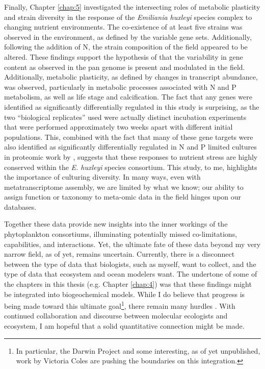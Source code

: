 Finally, Chapter \ref{chap:5} investigated the intersecting roles of metabolic plasticity and strain diversity in the response of the \textit{Emiliania huxleyi} species complex to changing nutrient environments. The co-existence of at least five strains was observed in the environment, as defined by the variable gene sets. Additionally, following the addition of N, the strain composition of the field appeared to be altered. These findings support the hypothesis of \citet{Read2013} that the variability in gene content as observed in the pan genome is present and modulated in the field. Additionally, metabolic plasticity, as defined by changes in transcript abundance, was observed, particularly in metabolic processes associated with N and P metabolism, as well as life stage and calcification. The fact that any genes were identified as significantly differentially regulated in this study is surprising, as the two ``biological replicates'' used were actually distinct incubation experiments that were performed approximately two weeks apart with different initial populations. This, combined with the fact that many of these gene targets were also identified as significantly differentially regulated in N and P limited cultures in proteomic work by \citet{McKew2015}, suggests that these responses to nutrient stress are highly conserved within the \textit{E. huxleyi} species consortium. This study, to me, highlights the importance of culturing diversity. In many ways, even with metatranscriptome assembly, we are limited by what we know; our ability to assign function or taxonomy to meta-omic data in the field hinges upon our databases. 
\par

Together these data provide new insights into the inner workings of the phytoplankton consortiums, illuminating potentially missed co-limitations, capabilities, and interactions. Yet, the ultimate fate of these data beyond my very narrow field, as of yet, remains uncertain. Currently, there is a disconnect between the type of data that biologists, such as myself, want to collect, and the type of data that ecosystem and ocean modelers want. The undertone of some of the chapters in this thesis (e.g. Chapter \ref{chap:4}) was that these findings might be integrated into biogeochemical models. While I do believe that progress is being made toward this ultimate goal\footnote{In particular, the Darwin Project \citep{Follows2007} and some interesting, as of yet unpublished, work by Victoria Coles are pushing the boundaries on this integration.}, there remain many hurdles \citep{Hood2007, Worden2015}. With continued collaboration and discourse between molecular ecologists and ecosystem, I am hopeful that a solid quantitative connection might be made. 
\clearpage
